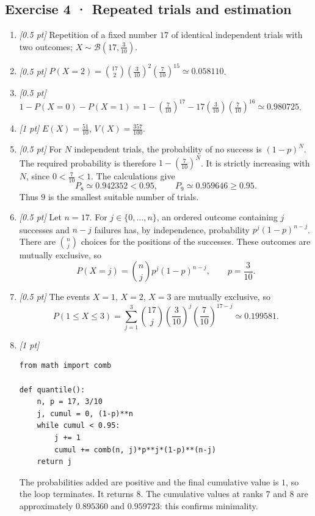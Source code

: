 \subsection*{Exercise 4 · Repeated trials and estimation}\begin{enumerate}

\item \textit{[0.5 pt]} Repetition of a fixed number $17$ of identical independent trials with two outcomes; $X\sim\mathcal B(17,\frac{3}{10})$.

\item \textit{[0.5 pt]} $P(X=2)=\binom{17}2(\frac{3}{10})^2(\frac{7}{10})^{15}\simeq0.058110$.

\item \textit{[0.5 pt]} $1-P(X=0)-P(X=1)=1-(\frac{7}{10})^{17}-17(\frac{3}{10})(\frac{7}{10})^{16}\simeq0.980725$.

\item \textit{[1 pt]} $E(X)=\frac{51}{10}$, $V(X)=\frac{357}{100}$.

\item \textit{[0.5 pt]} For $N$ independent trials, the probability of no success is $(1-p)^N$. The required probability is therefore $1-(\frac{7}{10})^N$. It is strictly increasing with $N$, since $0<\frac{7}{10}<1$. The calculations give
\[P_{8}\simeq0.942352<0.95,\qquad P_{9}\simeq0.959646\ge0.95.\]
Thus $9$ is the smallest suitable number of trials.

\item \textit{[0.5 pt]} Let $n=17$. For $j\in\{0,\ldots,n\}$, an ordered outcome containing $j$ successes and $n-j$ failures has, by independence, probability $p^j(1-p)^{n-j}$. There are $\binom nj$ choices for the positions of the successes. These outcomes are mutually exclusive, so
\[P(X=j)=\binom nj p^j(1-p)^{n-j},\qquad p=\frac{3}{10}.\]

\item \textit{[0.5 pt]} The events $X=1$, $X=2$, $X=3$ are mutually exclusive, so
\[P(1\le X\le3)=\sum_{j=1}^3\binom{17}j(\frac{3}{10})^j(\frac{7}{10})^{17-j}\simeq0.199581.\]


\item \textit{[1 pt]} 
\begin{lstlisting}
from math import comb

def quantile():
    n, p = 17, 3/10
    j, cumul = 0, (1-p)**n
    while cumul < 0.95:
        j += 1
        cumul += comb(n, j)*p**j*(1-p)**(n-j)
    return j
\end{lstlisting}
The probabilities added are positive and the final cumulative value is $1$, so the loop terminates. It returns $8$. The cumulative values at ranks $7$ and $8$ are approximately $0.895360$ and $0.959723$: this confirms minimality.

\end{enumerate}

